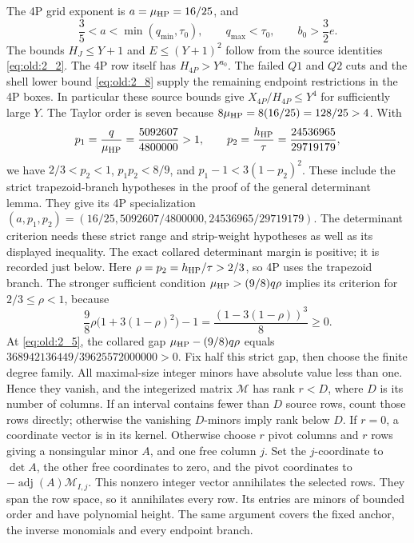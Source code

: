 The 4P grid exponent is \(a=\mu_{\rm HP}=16/25\), and
\[
 \frac35<a<\min(q_{\min},\tau_0),\qquad
 q_{\max}<\tau_0,\qquad b_0>\frac32e.
\]
The bounds \(H_J\le Y+1\) and \(E\le(Y+1)^2\) follow from the source
identities \eqref{eq:old:2_2}.  The 4P row itself has
\(H_{4P}>Y^{a_0}\).  The failed \(Q1\) and \(Q2\) cuts and the shell lower
bound \eqref{eq:old:2_8} supply the remaining endpoint restrictions in the
4P boxes.  In particular these source bounds give
\(X_{4P}/H_{4P}\le Y^4\) for sufficiently large \(Y\).  The Taylor order
is seven because \(8\mu_{\rm HP}=8(16/25)=128/25>4\).  With
\[
 p_1=\frac q{\mu_{\rm HP}}=\frac{5092607}{4800000}>1,
 \qquad
 p_2=\frac{h_{\rm HP}}\tau=\frac{24536965}{29719179},
\]
we have \(2/3<p_2<1\), \(p_1p_2<8/9\), and
\(p_1-1<3(1-p_2)^2\).  These include the strict trapezoid-branch hypotheses in
the proof of the general determinant lemma.  They give its 4P
specialization
\((a,p_1,p_2)=(16/25,5092607/4800000,24536965/29719179)\).
The determinant criterion needs these strict range and strip-weight
hypotheses as well as its displayed inequality.  The exact collared
determinant margin is positive; it is recorded just below.
Here \(\rho=p_2=h_{\rm HP}/\tau>2/3\), so 4P uses the trapezoid branch.
The stronger sufficient condition \(\mu_{\rm HP}>(9/8)q\rho\)
implies its criterion for \(2/3\le\rho<1\), because
\[
\frac98\rho\bigl(1+3(1-\rho)^2\bigr)-1
=\frac{(1-3(1-\rho))^3}{8}\ge0.
\]
At \eqref{eq:old:2_5}, the collared gap
\(\mu_{\rm HP}-(9/8)q\rho\) equals
$368942136449/39625572000000>0$.  Fix half this strict gap, then choose
the finite degree family.  All maximal-size integer minors have absolute
value less than one.  Hence they vanish, and the integerized matrix
\(\mathcal M\) has rank \(r<D\), where \(D\) is its number of columns.
If an interval contains fewer than \(D\) source rows, count those rows
directly; otherwise the vanishing \(D\)-minors imply rank below \(D\).
If \(r=0\), a coordinate vector is in its kernel.  Otherwise choose \(r\)
pivot columns and \(r\) rows giving a nonsingular minor \(A\), and one
free column \(j\).  Set the \(j\)-coordinate to \(\det A\), the other
free coordinates to zero, and the pivot coordinates to
\(-\operatorname{adj}(A)\mathcal M_{I,j}\).  This nonzero integer vector
annihilates the selected rows.  They span the row space, so it annihilates
every row.  Its entries are minors of bounded order and have polynomial
height.  The same argument covers the fixed anchor, the inverse monomials
and every endpoint branch.

